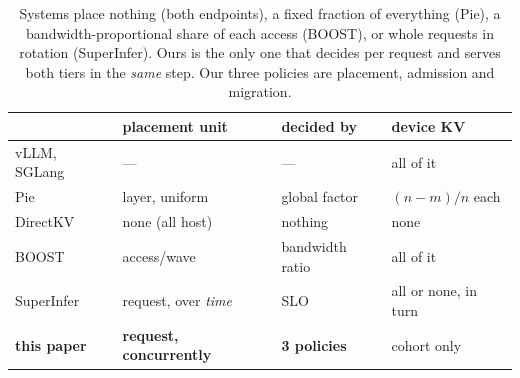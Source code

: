 \begin{table}[t]
\centering
\footnotesize
\setlength{\tabcolsep}{4pt}
\begin{tabular}{@{}llll@{}}
\toprule
 & placement unit & decided by & device KV \\
\midrule
vLLM, SGLang & --- & --- & all of it \\
Pie~\cite{pie} & layer, uniform & global factor & $(n{-}m)/n$ each \\
DirectKV~\cite{directkv} & none (all host) & nothing & none \\
BOOST~\cite{boost} & access/wave & bandwidth ratio & all of it \\
SuperInfer~\cite{superinfer} & request, over \emph{time} & SLO & all or none, in turn \\
\textbf{this paper} & \textbf{request, concurrently} & \textbf{3 policies} & cohort only \\
\bottomrule
\end{tabular}
\caption{Systems place nothing (both endpoints), a fixed fraction of everything
(Pie), a bandwidth-proportional share of each access (BOOST), or whole requests in
rotation (SuperInfer). Ours is the only one that decides per request and serves
both tiers in the \emph{same} step. Our three policies are placement, admission
and migration.}
\label{tab:axes}
\end{table}
